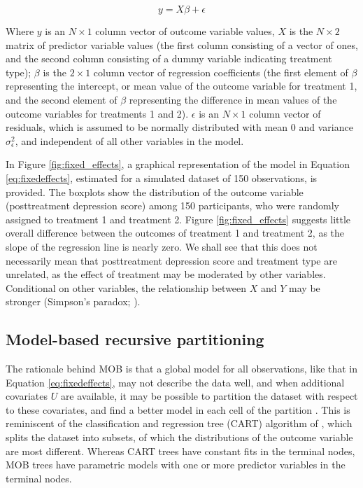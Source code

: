\documentclass[nobf,man]{apa}
\begin{document}
\begin{equation}
\label{eq:fixedeffects}
    y = X \beta + \epsilon
\end{equation}

Where $y$ is an $N \times 1$ column vector of outcome variable values, $X$ is the $N \times 2$ matrix of predictor variable values (the first column consisting of a vector of ones, and the second column consisting of a dummy variable indicating treatment type); $\beta$ is the $2 \times 1$ column vector of regression coefficients (the first element of $\beta$ representing the intercept, or mean value of the outcome variable for treatment 1, and the second element of $\beta$ representing the difference in mean values of the outcome variables for treatments 1 and 2). $\epsilon$ is an $N \times 1$ column vector of residuals, which is assumed to be normally distributed with mean 0 and variance $\sigma^{2}_{\epsilon}$, and independent of all other variables in the model. 

In Figure \ref{fig:fixed_effects}, a graphical representation of the model in Equation \ref{eq:fixedeffects}, estimated for a simulated dataset of 150 observations, is provided. The boxplots show the distribution of the outcome variable (posttreatment depression score) among 150 participants, who were randomly assigned to treatment 1 and treatment 2. Figure \ref{fig:fixed_effects} suggests little overall difference between the outcomes of treatment 1 and treatment 2, as the slope of the regression line is nearly zero. We shall see that this does not necessarily mean that posttreatment depression score and treatment type are unrelated, as the effect of treatment may be moderated by other variables. Conditional on other variables, the relationship between $X$ and $Y$ may be stronger (Simpson's paradox; ).




\subsection{Model-based recursive partitioning}

The rationale behind MOB is that a global model for all observations, like that in Equation \ref{eq:fixedeffects}, may not describe the data well, and when additional covariates $U$ are available, it may be possible to partition the dataset with respect to these covariates, and find a better model in each cell of the partition \cite{ZeilyHoth08}. This is reminiscent of the classification and regression tree (CART) algorithm of , which splits the dataset into subsets, of which the distributions of the outcome variable are most different. Whereas CART trees have constant fits in the terminal nodes, MOB trees have parametric models with one or more predictor variables in the terminal nodes.
\end{document}
